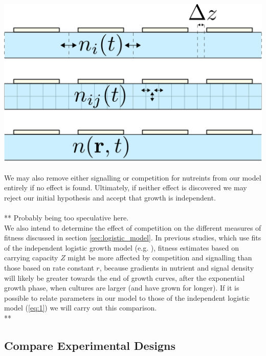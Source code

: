 \begin{Figure}
  \centering
  \includegraphics[width=\linewidth]{height_dep_miniqfa_delta_z}
  \label{fig:height_dependence}
\end{Figure}

We may also remove either signalling or competition for nutreints from
our model entirely if no effect is found. Ultimately, if neither
effect is discovered we may reject our initial hypothesis and accept
that growth is independent.
\\\\
** Probably being too speculative here.
\\
We also intend to determine the effect of competition on the different
measures of fitness discussed in section \ref{sec:logistic_model}. In
previous studies, which use fits of the independent logistic growth
model (e.g. \citet{Addinall2011}), fitness estimates based on carrying
capacity \(Z\) might be more affected by competition and signalling
than those based on rate constant \(r\), because gradients in nutrient
and signal density will likely be greater towards the end of growth
curves, after the exponential growth phase, when cultures are larger
(and have grown for longer). If it is possible to relate parameters in
our model to those of the independent logistic model (\ref{eq:1}) we
will carry out this comparison.
\\
**


\subsection{Compare Experimental Designs}
\label{sec:comp-exper-designs}

